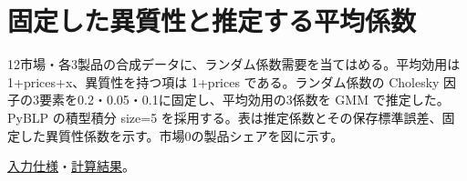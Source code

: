 \documentclass[ecta,nameyear,draft]{econsocart}
\begin{document}
\begin{minipage}{\linewidth}

\section{固定した異質性と推定する平均係数}\label{result-9}

12市場・各3製品の合成データに、ランダム係数需要を当てはめる。平均効用は
1+prices+x、異質性を持つ項は 1+prices である。ランダム係数の Cholesky
因子の3要素を0.2・0.05・0.1に固定し、平均効用の3係数を GMM
で推定した。PyBLP の積型積分 size=5
を採用する。表は推定係数とその保存標準誤差、固定した異質性係数を示す。市場0の製品シェアを図に示す。

\href{https://github.com/yoshimurahiroki/econ-project-mini/blob/f9093ba87cabce7bee1fdf3391656544617a8cb9/examples/research-workspace/models/blp-fixed-spec.json}{入力仕様}・\href{https://github.com/yoshimurahiroki/econ-project-mini/blob/f9093ba87cabce7bee1fdf3391656544617a8cb9/examples/research-workspace/models/blp-fixed-result.json}{計算結果}。


\end{minipage}
\end{document}
